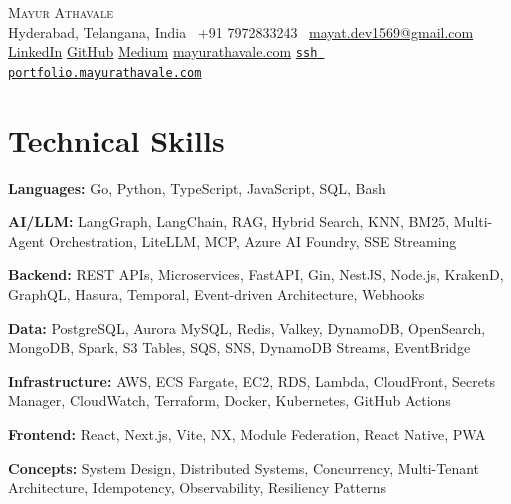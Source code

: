 \documentclass[letterpaper,10pt]{article}
\newcommand{\extlink}[2]{\href{#1}{#2}}
\newcommand{\techSkill}[2]{\par\noindent\small{\textbf{#1:} #2}\vspace{4pt}}
\begin{document}
\begin{center}
{\Huge \scshape Mayur Athavale} \\
\vspace{6pt}
\normalsize
Hyderabad, Telangana, India \hspace{6pt} \textbullet\ +91 7972833243 \hspace{6pt} \textbullet\ \href{mailto:mayat.dev1569@gmail.com}{mayat.dev1569@gmail.com} \\
\vspace{8pt}
\href{https://linkedin.com/in/mayurathavale1729}{LinkedIn} \hspace{4pt}\textbullet\hspace{4pt}
\href{https://github.com/mayurathavale18}{GitHub} \hspace{4pt}\textbullet\hspace{4pt}
\href{https://mayatdev1569.medium.com/}{Medium} \hspace{4pt}\textbullet\hspace{4pt}
\href{https://mayurathavale.com/}{mayurathavale.com} \hspace{4pt}\textbullet\hspace{4pt}
\href{ssh://portfolio.mayurathavale.com}{\texttt{ssh portfolio.mayurathavale.com}}
\end{center}

\section{Technical Skills}
\techSkill{Languages}{Go, Python, TypeScript, JavaScript, SQL, Bash}
\techSkill{AI/LLM}{LangGraph, LangChain, RAG, Hybrid Search, KNN, BM25, Multi-Agent Orchestration, LiteLLM, MCP, Azure AI Foundry, SSE Streaming}
\techSkill{Backend}{REST APIs, Microservices, FastAPI, Gin, NestJS, Node.js, KrakenD, GraphQL, Hasura, Temporal, Event-driven Architecture, Webhooks}
\techSkill{Data}{PostgreSQL, Aurora MySQL, Redis, Valkey, DynamoDB, OpenSearch, MongoDB, Spark, S3 Tables, SQS, SNS, DynamoDB Streams, EventBridge}
\techSkill{Infrastructure}{AWS, ECS Fargate, EC2, RDS, Lambda, CloudFront, Secrets Manager, CloudWatch, Terraform, Docker, Kubernetes, GitHub Actions}
\techSkill{Frontend}{React, Next.js, Vite, NX, Module Federation, React Native, PWA}
\techSkill{Concepts}{System Design, Distributed Systems, Concurrency, Multi-Tenant Architecture, Idempotency, Observability, Resiliency Patterns}
\end{document}
